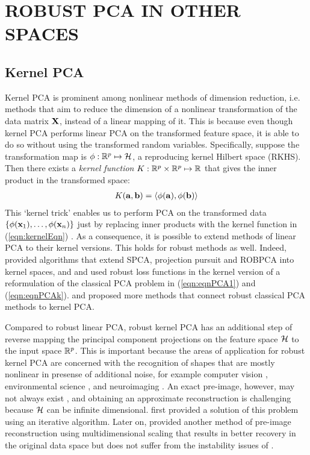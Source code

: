 \section*{\sffamily \Large ROBUST PCA IN OTHER SPACES}
\label{section:Others}

\subsection*{\sffamily \large Kernel PCA}
Kernel PCA is prominent among nonlinear methods of dimension reduction, i.e. methods that aim to reduce the dimension of a nonlinear transformation of the data matrix ${\mathbf{X}}$, instead of a linear mapping of it. This is because even though kernel PCA performs linear PCA on the transformed feature space, it is able to do so without using the transformed random variables. Specifically, suppose the transformation map is $\phi: {\mathbb{R}}^p \mapsto {\cal{H}}$, a reproducing kernel Hilbert space (RKHS). Then there exists a {\it kernel function} $K: {\mathbb{R}}^p \times {\mathbb{R}}^p \mapsto {\mathbb{R}}$ that gives the inner product in the transformed space:
%
\begin{align}\label{eqn:kernelEqn}
K( {\bf{a}}, {\bf{b}}) = \langle \phi({\bf{a}}), \phi({\bf{b}}) \rangle
\end{align}
%
This `kernel trick' enables us to perform PCA on the transformed data $\{ \phi({\bf{x}}_1), \ldots, \phi({\bf{x}}_n) \}$ just by replacing inner products with the kernel function in (\ref{eqn:kernelEqn}) \citep{Scholkopf99}. As a consequence, it is possible to extend methods of linear PCA to their kernel versions. This holds for robust methods as well. Indeed, \cite{DeBruyneVerdonck10,DebruyneEtal10} provided algorithms that extend SPCA, projection pursuit and ROBPCA into kernel spaces, and \cite{Yangetal14,HuangEtal09} and \cite{HuangReh11} used robust loss functions in the kernel version of a reformulation of the classical PCA problem in (\ref{eqn:eqnPCA1}) and (\ref{eqn:eqnPCAk}). \cite{WangEtal07, DengEtal07} and \cite{PangEtal10} proposed more methods that connect robust classical PCA methods to kernel PCA.

Compared to robust linear PCA, robust kernel PCA has an additional step of reverse mapping the principal component projections on the feature space ${\cal{H}}$ to the input space ${\mathbb{R}}^p$. This is important because the areas of application for robust kernel PCA are concerned with the recognition of shapes that are mostly nonlinear in presense of additional noise, for example computer vision \citep{Lampart08}, environmental science \citep{HsiehBook}, and neuroimaging \citep{MwangiEtal14}. An exact pre-image, however, may not always exist \citep{Mikaetal99}, and obtaining an approximate reconstruction is challenging because ${\cal{H}}$ can be infinite dimensional. \cite{Mikaetal99} first provided a solution of this problem using an iterative algorithm. Later on, \cite{KwokTsang03} provided another method of pre-image reconstruction using multidimensional scaling that results in better recovery in the original data space but does not suffer from the instability issues of \cite{Mikaetal99}.

